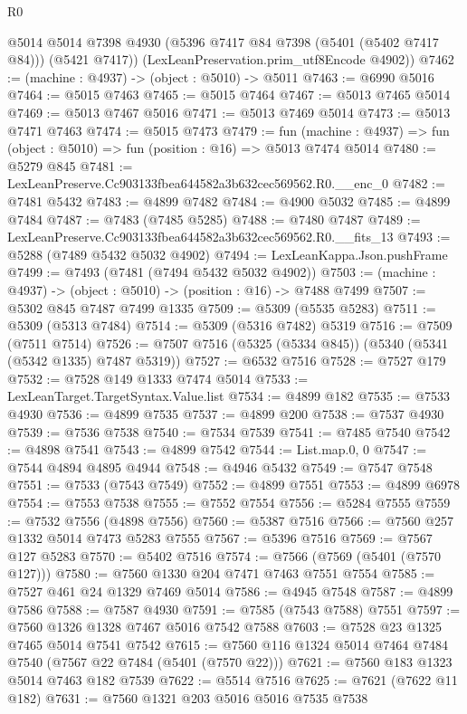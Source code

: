 \begin{lexlean}{R0}
\begin{coremodule}
        @5014
        @5014
        @7398
        @4930
        (@5396 @7417 @84 @7398 (@5401 (@5402 @7417 @84)))
        (@5421 @7417))
      (LexLeanPreservation.prim_utf8Encode @4902))
@7462 := (machine : @4937) -> (object : @5010) -> @5011
@7463 := @6990 @5016
@7464 := @5015 @7463
@7465 := @5015 @7464
@7467 := @5013 @7465 @5014
@7469 := @5013 @7467 @5016
@7471 := @5013 @7469 @5014
@7473 := @5013 @7471 @7463
@7474 := @5015 @7473
@7479 := fun (machine : @4937) => fun (object : @5010) => fun (position : @16) => @5013 @7474 @5014
@7480 := @5279 @845
@7481 := LexLeanPreserve.Cc903133fbea644582a3b632cec569562.R0.__enc_0
@7482 := @7481 @5432
@7483 := @4899 @7482
@7484 := @4900 @5032
@7485 := @4899 @7484
@7487 := @7483 (@7485 @5285)
@7488 := @7480 @7487
@7489 := LexLeanPreserve.Cc903133fbea644582a3b632cec569562.R0.__fits_13
@7493 := @5288 (@7489 @5432 @5032 @4902)
@7494 := LexLeanKappa.Json.pushFrame
@7499 := @7493 (@7481 (@7494 @5432 @5032 @4902))
@7503 := (machine : @4937) -> (object : @5010) -> (position : @16) -> @7488 @7499
@7507 := @5302 @845 @7487 @7499 @1335
@7509 := @5309 (@5535 @5283)
@7511 := @5309 (@5313 @7484)
@7514 := @5309 (@5316 @7482) @5319
@7516 := @7509 (@7511 @7514)
@7526 := @7507 @7516 (@5325 (@5334 @845)) (@5340 (@5341 (@5342 @1335) @7487 @5319))
@7527 := @6532 @7516
@7528 := @7527 @179
@7532 := @7528 @149 @1333 @7474 @5014
@7533 := LexLeanTarget.TargetSyntax.Value.list
@7534 := @4899 @182
@7535 := @7533 @4930
@7536 := @4899 @7535
@7537 := @4899 @200
@7538 := @7537 @4930
@7539 := @7536 @7538
@7540 := @7534 @7539
@7541 := @7485 @7540
@7542 := @4898 @7541
@7543 := @4899 @7542
@7544 := List.map.{0, 0}
@7547 := @7544 @4894 @4895 @4944
@7548 := @4946 @5432
@7549 := @7547 @7548
@7551 := @7533 (@7543 @7549)
@7552 := @4899 @7551
@7553 := @4899 @6978
@7554 := @7553 @7538
@7555 := @7552 @7554
@7556 := @5284 @7555
@7559 := @7532 @7556 (@4898 @7556)
@7560 := @5387 @7516
@7566 := @7560 @257 @1332 @5014 @7473 @5283 @7555
@7567 := @5396 @7516
@7569 := @7567 @127 @5283
@7570 := @5402 @7516
@7574 := @7566 (@7569 (@5401 (@7570 @127)))
@7580 := @7560 @1330 @204 @7471 @7463 @7551 @7554
@7585 := @7527 @461 @24 @1329 @7469 @5014
@7586 := @4945 @7548
@7587 := @4899 @7586
@7588 := @7587 @4930
@7591 := @7585 (@7543 @7588) @7551
@7597 := @7560 @1326 @1328 @7467 @5016 @7542 @7588
@7603 := @7528 @23 @1325 @7465 @5014 @7541 @7542
@7615 := @7560 @116 @1324 @5014 @7464 @7484 @7540 (@7567 @22 @7484 (@5401 (@7570 @22)))
@7621 := @7560 @183 @1323 @5014 @7463 @182 @7539
@7622 := @5514 @7516
@7625 := @7621 (@7622 @11 @182)
@7631 := @7560 @1321 @203 @5016 @5016 @7535 @7538

\end{coremodule}
\end{lexlean}
